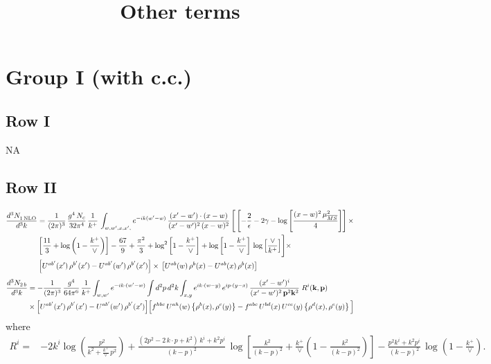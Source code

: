 \documentclass[9pt]{article}
\title{Other terms}
\author{}
\date{}
\numberwithin{equation}{section}
\begin{document}
\maketitle
\section{Group I (with c.c.)}
\subsection{Row I}
\textsc{NA}
\subsection{Row II}
\begin{align}
     \frac{d^{3}N_{1\,\rm NLO}^{\rm}}{d^{3}k} &  = \frac{1}{(2\pi)^{3}}\, \frac{g^{4}\,N_{c}}{32\pi^{4}}\,\frac{1}{k^{+}}\, \int_{w, w',x,x',} e^{-ik(w^\prime-w)}\, \frac{(x'-w')\cdot (x-w)}{(x'-w')^{2}\, (x-w)^{2}}\, \Bigg[\left[-\frac{2}{\epsilon}-2\gamma-\log{\left[\frac{(x-w)^{2}\,\mu^{2}_{\overline{MS}}}{4}\right]}\right]\times \notag \\ & \left[\frac{11}{3}+\log{\left(1-\frac{k^{+}}{\vee}\right)}\right]-\frac{67}{9}+\frac{\pi^{2}}{3}+\log^{2}{\left[1-\frac{k^{+}}{\vee}\right]}+\log{\left[1-\frac{k^{+}}{\vee}\right]}\,\log{\left[\frac{\vee}{k^{+}}\right]}\Bigg]\times\notag \\ & \left[U^{ab'}(x')\,\rho^{b'}(x') - U^{ab'}(w')\,\rho^{b'}(x')\right]\times\,\left[U^{ab}(w)\,\rho^{b}(x) - U^{ab}(x)\,\rho^{b}(x)\right]
\end{align}
\begin{align}
\frac{d^{3}N_{2\,b}}{d^{3}k} & = -\frac{1}{(2\pi)^{3}}\,\frac{g^{4}}{64\pi^{6}}\,\frac{1}{k^{+}}\int_{w,w'} e^{-ik\cdot(w'-w)}
\int d^{2}p\,d^{2}k\int_{x,y} e^{ik\cdot(w-y)}\,e^{ip\cdot(y-x)}\,\frac{(x'-w')^{i}}{(x'-w')^{2}\,\mathbf{p}^{2}\mathbf{k}^{2}}\;R^{i}(\mathbf{k},\mathbf{p})\notag\\
&\times\Big[U^{ab'}(x')\,\rho^{b'}(x')-U^{ab'}(w')\,\rho^{b'}(x')\Big]
\Big[f^{hbc}\,U^{ah}(w)\left\{\rho^{b}(x),\rho^{c}(y)\right\}-f^{abc}\,U^{bd}(x)\,U^{ce}(y)\left\{\rho^{d}(x),\rho^{e}(y)\right\}\Big]
\end{align}
where
\begin{align}
R^{i} =& -2k^{i}\log\left(\frac{p^{2}}{k^{2}+\frac{k^{+}}{\vee}\,p^{2}}\right)
+\frac{(2p^{2}-2\,k\cdot p+k^{2})\,k^{i}+k^{2}p^{i}}{(k-p)^{2}}\,
\log\left[\frac{k^{2}}{(k-p)^{2}}+\frac{k^{+}}{\vee}\left(1-\frac{k^{2}}{(k-p)^{2}}\right)\right]
-\frac{p^{2}k^{i}+k^{2}p^{i}}{(k-p)^{2}}\,\log\left(1-\frac{k^{+}}{\vee}\right).
\end{align}
\end{document}
